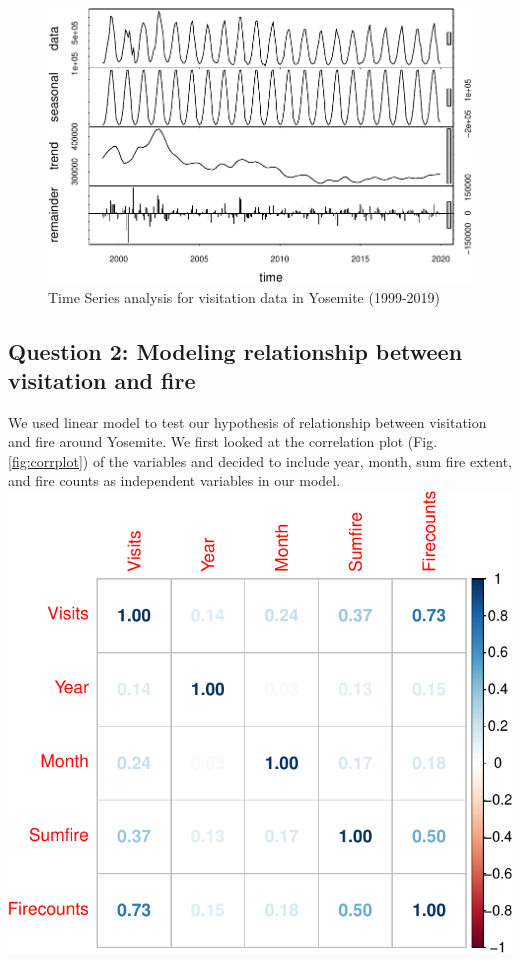 \documentclass[
  12pt,
]{article}
\begin{document}
\begin{figure}
\centering
\includegraphics{CodeFinal_files/figure-latex/TSplotvisit-1.pdf}
\caption{\label{fig:TSplotvisit}Time Series analysis for visitation data in Yosemite (1999-2019)}
\end{figure}

\hypertarget{question-2-modeling-relationship-between-visitation-and-fire}{%
\subsection{Question 2: Modeling relationship between visitation and fire}\label{question-2-modeling-relationship-between-visitation-and-fire}}

We used linear model to test our hypothesis of relationship between visitation and fire around Yosemite.
We first looked at the correlation plot (Fig. \ref{fig:corrplot}) of the variables and decided to include year, month, sum fire extent, and fire counts as independent variables in our model.
\includegraphics{CodeFinal_files/figure-latex/corrplot-1.pdf}
\end{document}
